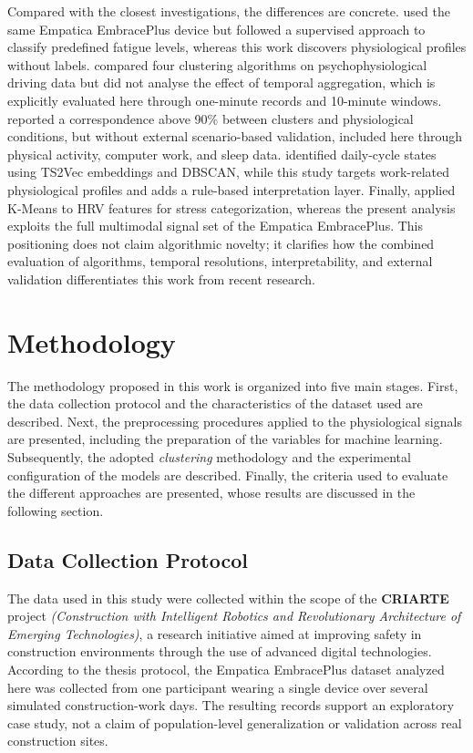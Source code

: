 \documentclass[a4paper,fleqn]{cas-sc}
\newcommand{\newtextblue}[1]{{\color{blue}#1}}
\newcommand{\newtextgreen}[1]{{\color{green!60!black}#1}}
\begin{document}
\newtextgreen{Compared with the closest investigations, the differences are concrete. \citet{albarran2025} used the same Empatica EmbracePlus device but followed a supervised approach to classify predefined fatigue levels, whereas this work discovers physiological profiles without labels. \citet{georgiev2026} compared four clustering algorithms on psychophysiological driving data but did not analyse the effect of temporal aggregation, which is explicitly evaluated here through one-minute records and 10-minute windows. \citet{georgieva2025} reported a correspondence above 90\% between clusters and physiological conditions, but without external scenario-based validation, included here through physical activity, computer work, and sleep data. \citet{arifin2025} identified daily-cycle states using TS2Vec embeddings and DBSCAN, while this study targets work-related physiological profiles and adds a rule-based interpretation layer. Finally, \citet{messaoud2025} applied K-Means to HRV features for stress categorization, whereas the present analysis exploits the full multimodal signal set of the Empatica EmbracePlus. This positioning does not claim algorithmic novelty; it clarifies how the combined evaluation of algorithms, temporal resolutions, interpretability, and external validation differentiates this work from recent research.}

\section{Methodology}\label{sec:method}

The methodology proposed in this work is organized into five main stages. First, the data collection protocol and the characteristics of the dataset used are described. Next, the preprocessing procedures applied to the physiological signals are presented, including the preparation of the variables for machine learning. Subsequently, the adopted \textit{clustering} methodology and the experimental configuration of the models are described. Finally, the criteria used to evaluate the different approaches are presented, whose results are discussed in the following section.

\subsection{Data Collection Protocol}
The data used in this study were collected within the scope of the \textbf{CRIARTE} project \textit{(Construction with Intelligent Robotics and Revolutionary Architecture of Emerging Technologies)}, a research initiative aimed at improving safety in construction environments through the use of advanced digital technologies. \newtextblue{According to the thesis protocol, the Empatica EmbracePlus dataset analyzed here was collected from one participant wearing a single device over several simulated construction-work days. The resulting records support an exploratory case study, not a claim of population-level generalization or validation across real construction sites.}
\end{document}

